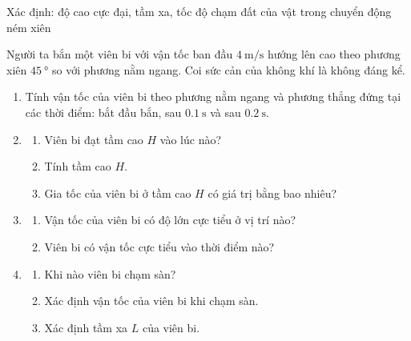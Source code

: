 \begin{dang}{Xác định: độ cao cực đại, tầm xa, tốc độ chạm đất của vật trong chuyển động ném xiên}
{Người ta bắn một viên bi với vận tốc ban đầu $\SI{4}{\meter/\second}$ hướng lên cao theo phương xiên $\SI{45}{\degree}$ so với phương nằm ngang. Coi sức cản của không khí là không đáng kể.
	\begin{enumerate}[label=\arabic*.]
		\item Tính vận tốc của viên bi theo phương nằm ngang và phương thẳng đứng tại các thời điểm: bắt đầu bắn, sau $\SI{0.1}{\second}$ và sau $\SI{0.2}{\second}$.
		\item \begin{enumerate}[label=\alph*)]
			\item Viên bi đạt tầm cao $H$ vào lúc nào?
			\item Tính tầm cao $H$.
			\item Gia tốc của viên bi ở tầm cao $H$ có giá trị bằng bao nhiêu?
		\end{enumerate}
	\item \begin{enumerate}[label=\alph*)]
		\item Vận tốc của viên bi có độ lớn cực tiểu ở vị trí nào?
		\item Viên bi có vận tốc cực tiểu vào thời điểm nào?
	\end{enumerate}
\item \begin{enumerate}[label=\alph*)]
	\item Khi nào viên bi chạm sàn?
	\item Xác định vận tốc của viên bi khi chạm sàn.
	\item Xác định tầm xa $L$ của viên bi.
\end{enumerate}
	\end{enumerate}
}
{}
\end{dang}
